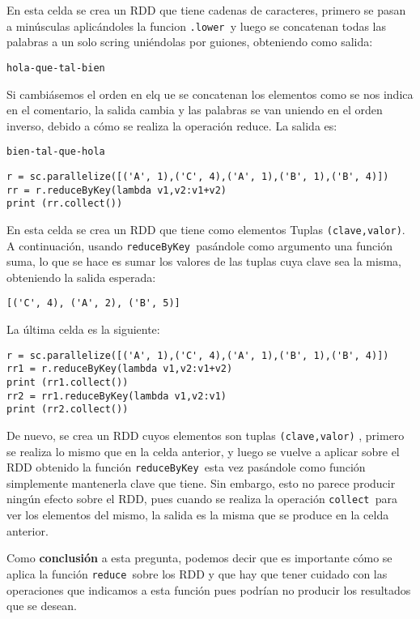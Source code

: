 \documentclass[11pt]{article}
\def\inline{\lstinline[basicstyle=\ttfamily,keywordstyle={}]}
\begin{document}
{{En esta celda se crea un RDD que tiene cadenas de caracteres, primero se pasan a minúsculas aplicándoles la funcion \inline{.lower }y luego se concatenan todas las palabras a un solo scring uniéndolas por guiones, obteniendo como salida:
\begin{verbatim}
hola-que-tal-bien
\end{verbatim}

Si cambiásemos el orden en elq ue se concatenan los elementos como se nos indica en el comentario, la salida cambia y las palabras se van uniendo en el orden inverso, debido a cómo se realiza la operación reduce. La salida es:
\begin{verbatim}
bien-tal-que-hola
\end{verbatim}

\begin{verbatim}
r = sc.parallelize([('A', 1),('C', 4),('A', 1),('B', 1),('B', 4)])
rr = r.reduceByKey(lambda v1,v2:v1+v2)
print (rr.collect())
\end{verbatim}

En esta celda se crea un RDD que tiene como elementos Tuplas  \inline{(clave,valor)}. A continuación, usando \inline{reduceByKey }pasándole como argumento una función suma, lo que se hace es sumar los valores de las tuplas cuya clave sea la misma, obteniendo la salida esperada:
\begin{verbatim}
[('C', 4), ('A', 2), ('B', 5)]
\end{verbatim}

La última celda es la siguiente:
\begin{verbatim}
r = sc.parallelize([('A', 1),('C', 4),('A', 1),('B', 1),('B', 4)])
rr1 = r.reduceByKey(lambda v1,v2:v1+v2)
print (rr1.collect())
rr2 = rr1.reduceByKey(lambda v1,v2:v1)
print (rr2.collect())
\end{verbatim}

De nuevo, se crea un RDD cuyos elementos son tuplas  \inline{(clave,valor)} , primero se realiza lo mismo que en la celda anterior, y luego se vuelve a aplicar sobre el RDD obtenido la función \inline{reduceByKey }esta vez pasándole como función simplemente mantenerla clave que tiene. Sin embargo, esto no parece producir ningún efecto sobre el RDD, pues cuando se realiza la operación  \inline{collect }para ver los elementos del mismo, la salida es la misma que se produce en la celda anterior.

Como \textbf{conclusión} a esta pregunta, podemos decir que es importante cómo se aplica la función \inline{reduce }sobre los RDD y que hay que tener cuidado con las operaciones que indicamos a esta función pues podrían no producir los resultados que se desean. 

}}
\end{document}
